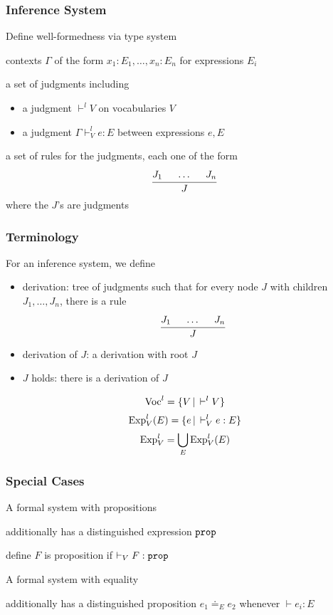\begin{frame}\frametitle{Inference System}
\begin{blockitems}{Define well-formedness via type system}
\item contexts $\Gamma$ of the form $x_1:E_1,\ldots,x_n:E_n$ for expressions $E_i$
\item a set of judgments including
 \begin{itemize}
  \item a judgment $\vdash^l V$ on vocabularies $V$
  \item a judgment $\Gamma\vdash^l_V e:E$ between expressions $e,E$
 \end{itemize}
\item a set of rules for the judgments, each one of the form
\[\cfrac{J_1 \hspace*{.5cm} \ldots \hspace*{.5cm} J_n}{J}\,\]
where the $J$'s are judgments
\end{blockitems}
\end{frame}

\begin{frame}\frametitle{Terminology}
For an inference system, we define
\begin{itemize}
\item derivation: tree of judgments such that for every node $J$ with children $J_1,\ldots,J_n$, there is a rule
\[\cfrac{J_1 \hspace*{.5cm} \ldots \hspace*{.5cm} J_n}{J}\,\]
\item derivation of $J$: a derivation with root $J$
\item $J$ holds: there is a derivation of $J$
\end{itemize}
\[\mathrm{Voc}^l = \{V\,|\,\vdash^l V\}\]
\[\mathrm{Exp}^l_V(E) = \{e\,|\,\vdash^l_V e:E\}\]
\[\mathrm{Exp}^l_V = \bigcup_E \mathrm{Exp}^l_V(E)\]
\end{frame}

\begin{frame}\frametitle{Special Cases}
\begin{blockitems}{A formal system with propositions}
\item additionally has a distinguished expression $\prop$
\item define $F$ is proposition if $\vdash_V F:\prop$
\end{blockitems}

\begin{blockitems}{A formal system with equality}
\item additionally has a distinguished proposition $e_1\doteq_E e_2$ whenever $\vdash e_i:E$
\end{blockitems}
\end{frame}

